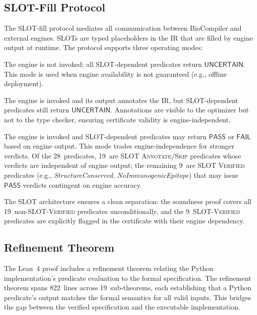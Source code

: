 \documentclass[acmsmall,review,anonymous]{acmart}
\newcommand{\PASS}{\ensuremath{\mathsf{PASS}}\xspace}
\newcommand{\FAIL}{\ensuremath{\mathsf{FAIL}}\xspace}
\newcommand{\UNCERTAIN}{\ensuremath{\mathsf{UNCERTAIN}}\xspace}
\begin{document}
\subsection{SLOT-Fill Protocol}\label{sec:slot-fill}

The SLOT-fill protocol mediates all communication between BioCompiler and
external engines.  SLOTs are typed placeholders in the IR that are filled
by engine output at runtime.  The protocol supports three operating
modes:

\begin{description}[leftmargin=!,labelwidth=2.8cm,itemsep=1pt,topsep=1pt]
\item[SLOT \textsc{Skip}:]
The engine is not invoked; all SLOT-dependent predicates return
\UNCERTAIN.  This mode is used when engine availability is not
guaranteed (e.g., offline deployment).

\item[SLOT \textsc{Annotate}:]
The engine is invoked and its output annotates the IR, but
SLOT-dependent predicates still return \UNCERTAIN.  Annotations are
visible to the optimizer but not to the type checker, ensuring
certificate validity is engine-independent.

\item[SLOT \textsc{Verified}:]
The engine is invoked and SLOT-dependent predicates may return \PASS{}
or \FAIL{} based on engine output.  This mode trades engine-independence
for stronger verdicts.  Of the 28~predicates, 19~are SLOT
\textsc{Annotate}/\textsc{Skip} predicates whose verdicts are
independent of engine output; the remaining 9~are SLOT \textsc{Verified}
predicates (e.g., \emph{StructureConserved}, \emph{NoImmunogenicEpitope})
that may issue \PASS{} verdicts contingent on engine accuracy.
\end{description}

The SLOT architecture ensures a clean separation: the soundness proof
covers all 19~non-SLOT-\textsc{Verified} predicates unconditionally, and
the 9~SLOT-\textsc{Verified} predicates are explicitly flagged in the
certificate with their engine dependency.

\subsection{Refinement Theorem}

The Lean~4 proof includes a refinement theorem relating the Python
implementation's predicate evaluation to the formal specification.  The
refinement theorem spans 822~lines across 19~sub-theorems, each
establishing that a Python predicate's output matches the formal
semantics for all valid inputs.  This bridges the gap between the
verified specification and the executable implementation.
\end{document}
